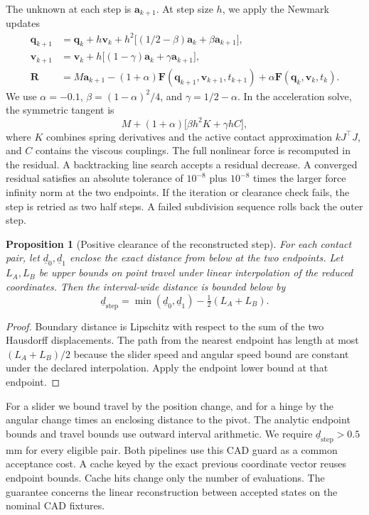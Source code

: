 \documentclass[10pt,a4paper]{article}
\newtheorem{proposition}{Proposition}
\newcommand{\q}{\mathbf q}
\newcommand{\vct}{\mathbf v}
\newcommand{\acc}{\mathbf a}
\newcommand{\force}{\mathbf F}
\begin{document}
The unknown at each step is \(\acc_{k+1}\). At step size \(h\), we apply the Newmark updates
\begin{align}
    \q_{k+1}&=\q_k+h\vct_k+h^2\bigl[(1/2-\beta)\acc_k+\beta\acc_{k+1}\bigr],\\
    \vct_{k+1}&=\vct_k+h\bigl[(1-\gamma)\acc_k+\gamma\acc_{k+1}\bigr],\\
    \mathbf R&=M\acc_{k+1}-(1+\alpha)\force(\q_{k+1},\vct_{k+1},t_{k+1})
                    +\alpha\force(\q_k,\vct_k,t_k).
\end{align}
We use \(\alpha=-0.1\), \(\beta=(1-\alpha)^2/4\), and \(\gamma=1/2-\alpha\). In the acceleration solve, the symmetric tangent is
\begin{equation}
M+(1+\alpha)\bigl[\beta h^2 K+\gamma h C\bigr],
\end{equation}
where \(K\) combines spring derivatives and the active contact approximation \(kJ^\top J\), and \(C\) contains the viscous couplings. The full nonlinear force is recomputed in the residual. A backtracking line search accepts a residual decrease. A converged residual satisfies an absolute tolerance of \(10^{-8}\) plus \(10^{-8}\) times the larger force infinity norm at the two endpoints. If the iteration or clearance check fails, the step is retried as two half steps. A failed subdivision sequence rolls back the outer step.

\begin{proposition}[Positive clearance of the reconstructed step]
For each contact pair, let \(\underline d_0,\underline d_1\) enclose the exact distance from below at the two endpoints. Let \(L_A,L_B\) be upper bounds on point travel under linear interpolation of the reduced coordinates. Then the interval-wide distance is bounded below by
\begin{equation}
    \underline d_{\mathrm{step}}
      =\min(\underline d_0,\underline d_1)-\tfrac12(L_A+L_B).
    \label{eq:guard}
\end{equation}
\end{proposition}
\begin{proof}
Boundary distance is Lipschitz with respect to the sum of the two Hausdorff displacements. The path from the nearest endpoint has length at most \((L_A+L_B)/2\) because the slider speed and angular speed bound are constant under the declared interpolation. Apply the endpoint lower bound at that endpoint.
\end{proof}

For a slider we bound travel by the position change, and for a hinge by the angular change times an enclosing distance to the pivot. The analytic endpoint bounds and travel bounds use outward interval arithmetic. We require \(\underline d_{\mathrm{step}}>0.5\) mm for every eligible pair. Both pipelines use this CAD guard as a common acceptance cost. A cache keyed by the exact previous coordinate vector reuses endpoint bounds. Cache hits change only the number of evaluations. The guarantee concerns the linear reconstruction between accepted states on the nominal CAD fixtures.
\end{document}
